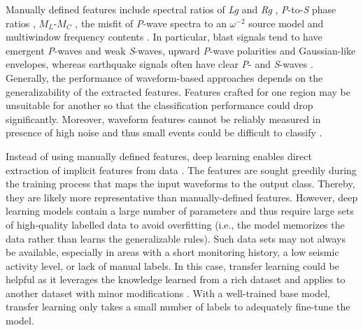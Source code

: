 \documentclass{gji}
\begin{document}
Manually defined features include spectral ratios of \textit{Lg} \citep{bennett} and \textit{Rg} \citep{tibi_depth}, \textit{P}-to-\textit{S} phase ratios \citep{hartse,wang_grl,wang_jgr,kong}, $M_L$-$M_C$ \citep[$M_L$, local magnitude; $M_C$, coda magnitude.][]{koper,koper_20,wang_grl,kong}, the misfit of \textit{P}-wave spectra to an $\omega^{-2}$ source model \citep{allmann} and multiwindow frequency contents \citep{miao}. In particular, blast signals tend to have emergent \textit{P}-waves and weak \textit{S}-waves, upward \textit{P}-wave polarities and Gaussian-like envelopes, whereas earthquake signals often have clear \textit{P}- and \textit{S}-waves \citep{miao,stump,tang}. Generally, the performance of waveform-based approaches depends on the generalizability of the extracted features. Features crafted for one region may be unsuitable for another so that the classification performance could drop significantly. Moreover, waveform features cannot be reliably measured in presence of high noise and thus small events could be difficult to classify \citep{linville_19,tibi_compare}.

Instead of using manually defined features, deep learning enables direct extraction of implicit features from data \citep{linville_19,liu,gpd,polarity,zhulijun,phasenet}. The features are sought greedily during the training process that maps the input waveforms to the output class. Thereby, they are likely more representative than manually-defined features. However, deep learning models contain a large number of parameters and thus require large sets of high-quality labelled data to avoid overfitting (i.e., the model memorizes the data rather than learns the generalizable rules). Such data sets may not always be available, especially in areas with a short monitoring history, a low seismic activity level, or lack of manual labels. In this case, transfer learning could be helpful as it leverages the knowledge learned from a rich dataset and applies to another dataset with minor modifications \citep{chai,do,ismail,pan_domain,zhuy,transferable}. With a well-trained base model, transfer learning only takes a small number of labels to adequately fine-tune the model.
\end{document}
